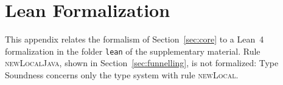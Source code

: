 \section{Lean Formalization}
\label{app:lean}
\lstset{breaklines=true}
\newcommand{\leanfile}[1]{\texttt{lean/Funnelling/#1}}
\newsavebox{\fitbox}
\newcommand{\fit}[1]{\sbox{\fitbox}{#1}\ifdim\wd\fitbox>\linewidth\resizebox{\linewidth}{!}{\usebox{\fitbox}}\else\usebox{\fitbox}\fi}
\newenvironment{cmp}[1]{\par\medskip\noindent\begin{minipage}{\textwidth}\textbf{#1}\par\smallskip\noindent}{\end{minipage}\par}
\newenvironment{paperside}{\begin{minipage}[t]{0.45\textwidth}\vspace{0pt}\scriptsize\raggedright\lstset{basicstyle=\scriptsize\ttfamily}}{\end{minipage}\hfill}
\newenvironment{leanside}{\begin{minipage}[t]{0.53\textwidth}\vspace{0pt}}{\end{minipage}}
\newcommand{\mapping}[1]{\par\smallskip\noindent{\scriptsize\lstset{basicstyle=\scriptsize\ttfamily}\textit{Mapping.} #1}\par\smallskip\hrule}
\newcommand{\nomapping}{\par\smallskip\hrule}

This appendix relates the formalism of Section~\ref{sec:core} to a Lean~4 formalization in the folder \texttt{lean} of the supplementary material.
Rule \textsc{newLocalJava}, shown in Section~\ref{sec:funnelling}, is not formalized: Type Soundness concerns only the type system with rule \textsc{newLocal}.

